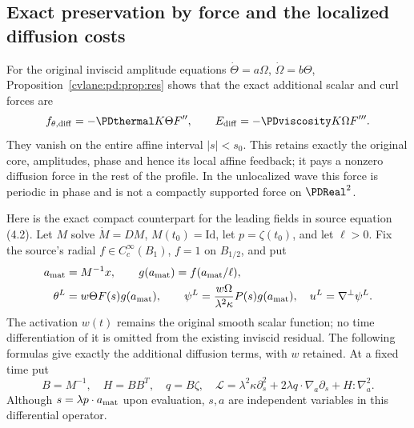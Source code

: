 \subsection{Exact preservation by force and the localized diffusion costs}

For the original inviscid amplitude equations $\dot\Theta=a\Omega$,
$\dot\Omega=b\Theta$, Proposition~\ref{cvlane:pd:prop:res} shows that the exact
additional scalar and curl forces are
\begin{equation}\label{cvlane:pd:eq:repair}
 f_{\theta,\mathrm{diff}}=-\PDthermal K\Theta F'',\qquad
 E_{\mathrm{diff}}=-\PDviscosity K\Omega F'''.
\end{equation}
They vanish on the entire affine interval $|s|<s_0$. This retains exactly
the original core, amplitudes, phase and hence its local affine feedback;
it pays a nonzero diffusion force in the rest of the profile. In the
unlocalized wave this force is periodic in phase and is not a compactly
supported force on $\PDReal^2$.

Here is the exact compact counterpart for the leading fields in source
equation (4.2). Let $M$ solve $\dot M=DM$, $M(t_0)=\mathrm{Id}$, let
$p=\zeta(t_0)$, and let $\ell>0$. Fix the source's radial
$f\in C_c^\infty(B_1)$, $f=1$ on $B_{1/2}$, and put
\begin{align}\label{cvlane:pd:eq:localized}
 a_{\rm mat}&=M^{-1}x,\qquad g(a_{\rm mat})=f(a_{\rm mat}/\ell),\notag\\
 \theta^L&=w\Theta F(s)g(a_{\rm mat}),\qquad
 \psi^L=\frac{w\Omega}{\lambda^2\kappa}P(s)g(a_{\rm mat}),\quad
 u^L=\nabla^\perp\psi^L.
\end{align}
The activation $w(t)$ remains the original smooth scalar function; no
time differentiation of it is omitted from the existing inviscid
residual. The following formulas give exactly the additional diffusion
terms, with $w$ retained.
At a fixed time put
\begin{equation}\label{cvlane:pd:eq:L}
 B=M^{-1},\quad H=BB^T,\quad q=B\zeta,\quad
 \mathscr L=\lambda^2\kappa\partial_s^2+
            2\lambda q\cdot\nabla_a\partial_s+H:\nabla_a^2.
\end{equation}
Although $s=\lambda p\cdot a_{\rm mat}$ upon evaluation, $s,a$ are
independent variables in this differential operator.

